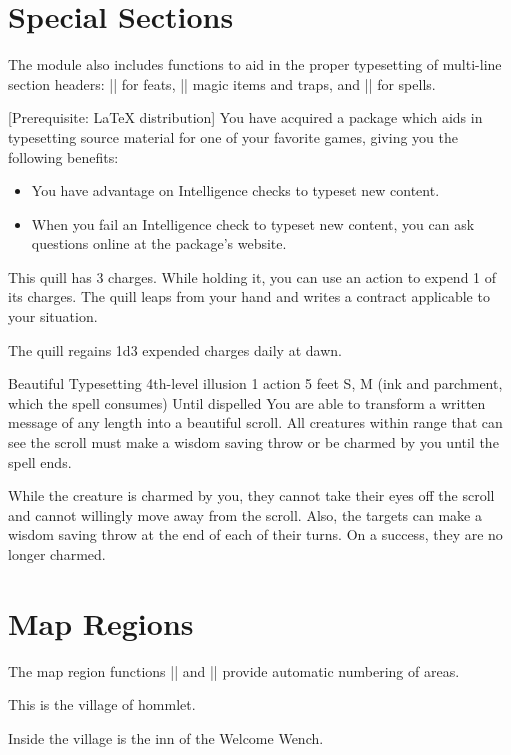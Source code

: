 \documentclass[letterpaper,twocolumn,openany,nodeprecatedcode]{dndbook}
\begin{document}
\section{Special Sections}
The module also includes functions to aid in the proper typesetting of multi-line section headers: |\DndFeatHeader| for feats, |\DndItemHeader| magic items and traps, and |\DndSpellHeader| for spells.

[Prerequisite: \LaTeX{} distribution]
You have acquired a package which aids in typesetting source material for one of your favorite games, giving you the following benefits:

\begin{itemize}
	\item You have advantage on Intelligence checks to typeset new content.
	\item When you fail an Intelligence check to typeset new content, you can ask questions online at the package's website.
\end{itemize}

This quill has 3 charges. While holding it, you can use an action to expend 1 of its charges. The quill leaps from your hand and writes a contract applicable to your situation.

The quill regains 1d3 expended charges daily at dawn.

\DndSpellHeader%
{Beautiful Typesetting}
{4th-level illusion}
{1 action}
{5 feet}
{S, M (ink and parchment, which the spell consumes)}
{Until dispelled}
You are able to transform a written message of any length into a beautiful scroll. All creatures within range that can see the scroll must make a wisdom saving throw or be charmed by you until the spell ends.

While the creature is charmed by you, they cannot take their eyes off the scroll and cannot willingly move away from the scroll. Also, the targets can make a wisdom saving throw at the end of each of their turns. On a success, they are no longer charmed.

\section{Map Regions}
The map region functions |\DndArea| and |\DndSubArea| provide automatic numbering of areas.

This is the village of hommlet.

Inside the village is the inn of the Welcome Wench.
\end{document}
